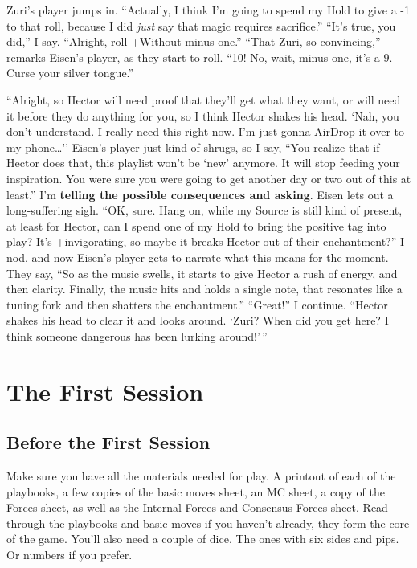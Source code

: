 \documentclass[
  oneside,
  statementpaper,
  9pt]{memoir}
\begin{document}
Zuri's player jumps in. ``Actually, I think I'm going to spend my Hold
to give a -1 to that roll, because I did \emph{just} say that magic
requires sacrifice.'' ``It's true, you did,'' I say. ``Alright, roll
+Without minus one.'' ``That Zuri, so convincing,'' remarks Eisen's
player, as they start to roll. ``10! No, wait, minus one, it's a 9.
Curse your silver tongue.''

``Alright, so Hector will need proof that they'll get what they want, or
will need it before they do anything for you, so I think Hector shakes
his head. `Nah, you don't understand. I really need this right now. I'm
just gonna AirDrop it over to my phone\ldots{}'' Eisen's player just
kind of shrugs, so I say, ``You realize that if Hector does that, this
playlist won't be `new' anymore. It will stop feeding your inspiration.
You were sure you were going to get another day or two out of this at
least.'' I'm \textbf{telling the possible consequences and asking}.
Eisen lets out a long-suffering sigh. ``OK, sure. Hang on, while my
Source is still kind of present, at least for Hector, can I spend one of
my Hold to bring the positive tag into play? It's +invigorating, so
maybe it breaks Hector out of their enchantment?'' I nod, and now
Eisen's player gets to narrate what this means for the moment. They say,
``So as the music swells, it starts to give Hector a rush of energy, and
then clarity. Finally, the music hits and holds a single note, that
resonates like a tuning fork and then shatters the enchantment.''
``Great!'' I continue. ``Hector shakes his head to clear it and looks
around. `Zuri? When did you get here? I think someone dangerous has been
lurking around!'\,''

\newpage

\hypertarget{the-first-session}{%
\chapter{The First Session}\label{the-first-session}}

\hypertarget{before-the-first-session}{%
\section{Before the First Session}\label{before-the-first-session}}

Make sure you have all the materials needed for play. A printout of each
of the playbooks, a few copies of the basic moves sheet, an MC sheet, a
copy of the Forces sheet, as well as the Internal Forces and Consensus
Forces sheet. Read through the playbooks and basic moves if you haven't
already, they form the core of the game. You'll also need a couple of
dice. The ones with six sides and pips. Or numbers if you prefer.
\end{document}
